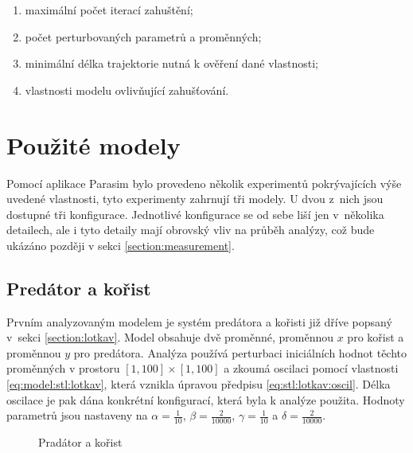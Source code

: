 \begin{enumerate}
	\item	maximální počet iterací zahuštění;
	\item	počet perturbovaných parametrů a proměnných;
	\item	minimální délka trajektorie nutná k ověření dané vlastnosti;
	\item	vlastnosti modelu ovlivňující zahušťování.
\end{enumerate}

\section{Použité modely}

Pomocí aplikace Parasim bylo provedeno několik experimentů po\-krý\-va\-jí\-cích výše uvedené vlastnosti, tyto experimenty
zahrnují tři modely. U dvou z~nich jsou dostupné tři konfigurace. Jednotlivé konfigurace se od sebe liší 
jen v~několika detailech, ale i tyto detaily mají obrovský vliv na průběh analýzy, což bude ukázáno později
v sekci \ref{section:measurement}.

\subsection{Predátor a kořist}

Prvním analyzovaným modelem je systém predátora a kořisti již dříve popsaný v~sek\-ci \ref{section:lotkav}. Model
obsahuje dvě proměnné, proměnnou $x$ pro kořist a pro\-měn\-nou $y$ pro predátora. Analýza používá
perturbaci iniciálních hodnot  těchto proměnných v prostoru $[1, 100] \times [1, 100]$ a zkoumá oscilaci pomocí vlastnosti \ref{eq:model:stl:lotkav},
která vznikla úpravou předpisu \ref{eq:stl:lotkav:oscil}. Délka oscilace je pak dána konkrétní konfigurací,
která byla k analýze použita. Hodnoty parametrů jsou nastaveny na $\alpha = \frac{1}{10}$,  $\beta = \frac{2}{10000}$, $\gamma = \frac{1}{10}$ a $\delta = \frac{2}{10000}$.

\begin{figure}[h!]
\begin{center}
\caption{Pradátor a kořist}
\end{center}
\end{figure}

